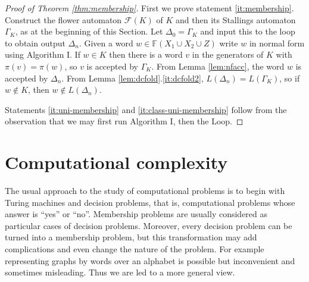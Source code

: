 \documentclass[a4paper,12pt]{article}
\newcommand{\G}{\Gamma }
\newcommand{\D}{\Delta }
\renewcommand{\L}{\Lambda }
\renewcommand{\S}{\Sigma }
\newcommand{\cA}{{\cal{A}}}
\newcommand{\cF}{{\cal{F}}}
\newtheorem{theorem}{Theorem}[section]
\numberwithin{equation}{section}
\numberwithin{figure}{section}
\newcommand{\FF}{\ensuremath{\mathbb{F}}}
\renewcommand{\cF}{\mathcal{F}}
\begin{document}

\begin{proof}[Proof of Theorem \ref{thm:membership}]
First we prove statement \ref{it:membership}. 
Construct the flower automaton $\cF(K)$ of $K$ and then
its Stallings automaton $\G_K$,  as at the beginning of this Section. %
Let $\D_0=\G_K$ and input this to the loop to obtain output $\D_n$.
Given a word $w\in \FF(X_1\cup X_2\cup Z)$ write $w$ in normal form
using Algorithm I. If $w\in K$ then there is a word $v$ in the generators
 of $K$ with $\pi(v)=\pi(w)$, so $v$ is accepted by $\G_K$. From
Lemma \ref{lem:nfacc}, the word $w$ is accepted by $\D_n$. From
Lemma \ref{lem:dcfold}.\ref{it:dcfold2}, $L(\D_n)=L(\G_K)$,
so if $w\notin K$, then
$w\notin L(\D_n)$.

Statements \ref{it:uni-membership} and \ref{it:class-uni-membership} follow
from the observation that we may 
first run Algorithm I, then the Loop.
\end{proof}

\section{Computational complexity}\label{sec:TC}
The usual approach to the study of computational problems is to
begin with Turing machines and decision
problems, that is, computational problems whose answer is ``yes'' or
``no''. Membership problems are usually considered as particular cases of decision problems.
Moreover, every decision problem can be turned into a membership
problem, but this transformation may add complications and even
change the nature of the problem. For example representing graphs by
words over an alphabet is possible but inconvenient and sometimes
misleading. Thus we are led to a more general view.
\end{document}
